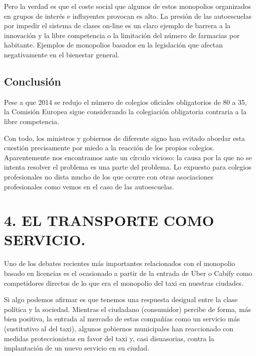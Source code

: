 \documentclass[
]{article}
\begin{document}
Pero la verdad es que el coste social que algunos de estos monopolios
organizados en grupos de interés e influyentes provocan es alto. La
presión de las autoescuelas por impedir el sistema de clases on-line es
un claro ejemplo de barrera a la innovación y la libre competencia o la
limitación del número de farmacias por habitante. Ejemplos de monopolios
basados en la legislación que afectan negativamente en el bienestar
general.

\hypertarget{conclusiuxf3n}{%
\subsection*{Conclusión}\label{conclusiuxf3n}}

Pese a que 2014 se redujo el número de colegios oficiales obligatorios
de 80 a 35, la Comisión Europea sigue considerando la colegiación
obligatoria contraria a la libre competencia.

Con todo, los ministros y gobiernos de diferente signo han evitado
abordar esta cuestión precisamente por miedo a la reacción de los
propios colegios. Aparentemente nos encontramos ante un círculo vicioso:
la causa por la que no se intenta resolver el problema es una parte del
problema. Lo expuesto para colegios profesionales no dista mucho de los
que ocurre con otras asociaciones profesionales como vemos en el caso de
las autoescuelas.

\hypertarget{section-1}{%
\section*{}\label{section-1}}

\hypertarget{el-transporte-como-servicio.}{%
\section{4. EL TRANSPORTE COMO
SERVICIO.}\label{el-transporte-como-servicio.}}

Uno de los debates recientes más importantes relacionados con el
monopolio basado en licencias es el ocasionado a partir de la entrada de
Uber o Cabify como competidores directos de lo que era el monopolio del
taxi en nuestras ciudades.

Si algo podemos afirmar es que tenemos una respuesta desigual entre la
clase política y la sociedad. Mientras el ciudadano (consumidor) percibe
de forma, más bien positiva, la entrada al mercado de estas compañías
como un servicio más (sustitutivo al del taxi), algunos gobiernos
municipales han reaccionado con medidas proteccionistas en favor del
taxi y, casi disuasorias, contra la implantación de un nuevo servicio en
su ciudad.
\end{document}
